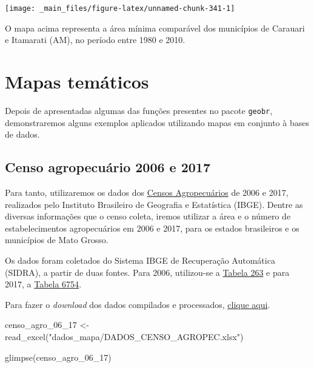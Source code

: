 \documentclass[
  brazilian,
]{book}
\newenvironment{Shaded}{\begin{snugshade}}{\end{snugshade}}
\newcommand{\FunctionTok}[1]{\textcolor[rgb]{0.00,0.00,0.00}{#1}}
\newcommand{\NormalTok}[1]{#1}
\newcommand{\OtherTok}[1]{\textcolor[rgb]{0.56,0.35,0.01}{#1}}
\newcommand{\StringTok}[1]{\textcolor[rgb]{0.31,0.60,0.02}{#1}}
\begin{document}
\begin{center}\texttt{[image: \_main\_files/figure-latex/unnamed-chunk-341-1]} \end{center}

O mapa acima representa a área mínima comparável dos municípios de Carauari e Itamarati (AM), no período entre 1980 e 2010.

\hypertarget{mapas-temuxe1ticos}{%
\section{Mapas temáticos}\label{mapas-temuxe1ticos}}

Depois de apresentadas algumas das funções presentes no pacote \texttt{geobr}, demonstraremos alguns exemplos aplicados utilizando mapas em conjunto à bases de dados.

\hypertarget{censo-agropecuuxe1rio-2006-e-2017}{%
\subsection{Censo agropecuário 2006 e 2017}\label{censo-agropecuuxe1rio-2006-e-2017}}

Para tanto, utilizaremos os dados dos \href{https://www.ibge.gov.br/estatisticas/economicas/agricultura-e-pecuaria/21814-2017-censo-agropecuario.html?=\&t=destaques}{Censos Agropecuários} de 2006 e 2017, realizados pelo Instituto Brasileiro de Geografia e Estatística (IBGE). Dentre as diversas informações que o censo coleta, iremos utilizar a área e o número de estabelecimentos agropecuários em 2006 e 2017, para os estados brasileiros e os municípios de Mato Grosso.

Os dados foram coletados do Sistema IBGE de Recuperação Automática (SIDRA), a partir de duas fontes. Para 2006, utilizou-se a \href{https://sidra.ibge.gov.br/tabela/263}{Tabela 263} e para 2017, a \href{https://sidra.ibge.gov.br/tabela/6754}{Tabela 6754}.

Para fazer o \emph{download} dos dados compilados e processados, \href{https://github.com/gustavojy/ApostilaCD-R/blob/main/dados_zip/dados_mapa.zip?raw=true}{clique aqui}.

\begin{Shaded}
\begin{Highlighting}[]
\NormalTok{censo\_agro\_06\_17 }\OtherTok{\textless{}{-}} \FunctionTok{read\_excel}\NormalTok{(}\StringTok{"dados\_mapa/DADOS\_CENSO\_AGROPEC.xlsx"}\NormalTok{)}

\FunctionTok{glimpse}\NormalTok{(censo\_agro\_06\_17)}
\end{Highlighting}
\end{Shaded}
\end{document}
